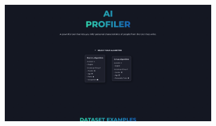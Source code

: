\bigskip
\begin{figure}[H]
	\centering
	\begin{subfigure}[c]{0.74\textwidth}
		\centering
		\includegraphics[width=\textwidth]{imagenes/algorithms.png}
		\label{fig:casouso_algorithms_escritorio}
	\end{subfigure}
	\hfill
	\begin{subfigure}[c]{0.21\textwidth}
		\centering

\end{subfigure}
\end{figure}
